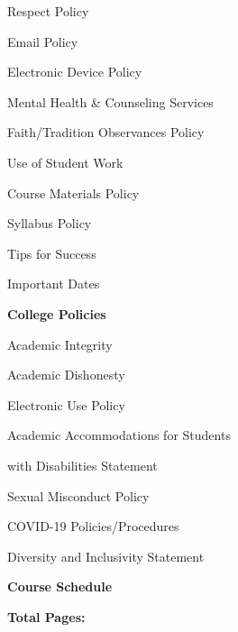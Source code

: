 \documentclass[11pt,letterpaper]{article}
\begin{document}
\begin{minipage}[t]{0.45\textwidth}
\hspace{0.3cm} Respect Policy \dotfill \pageref{respect}
%
\end{minipage}\hfill\begin{minipage}[t]{0.45\textwidth} \par
\hspace{0.3cm} Email Policy \dotfill \pageref{email_policy} \par
\hspace{0.3cm} Electronic Device Policy \dotfill \pageref{electronic} \par
\hspace{0.3cm} Mental Health \& Counseling Services \dotfill \pageref{mental_health} \par
\hspace{0.3cm} Faith/Tradition Observances Policy \dotfill \pageref{faith} \par
\hspace{0.3cm} Use of Student Work \dotfill \pageref{std_work} \par
\hspace{0.3cm} Course Materials Policy \dotfill \pageref{copyright} \par
\hspace{0.3cm} Syllabus Policy \dotfill \pageref{syllabus} \par
\hspace{0.3cm} Tips for Success \dotfill \pageref{tips} \par
\hspace{0.3cm} Important Dates \dotfill \pageref{imp_dates} \par
{\bfseries\color{stacred} College Policies} \dotfill \pageref{college_polc} \par
\hspace{0.3cm} Academic Integrity \dotfill \pageref{college_acadint} \par
\hspace{0.3cm} Academic Dishonesty \dotfill \pageref{college_acaddis} \par
\hspace{0.3cm} Electronic Use Policy \dotfill \pageref{college_elecuse} \par
\hspace{0.3cm} Academic Accommodations for Students \par
\hspace{0.6cm} with Disabilities Statement \dotfill \pageref{college_acadacc} \par
\hspace{0.3cm} Sexual Misconduct Policy \dotfill \pageref{college_sexmisconduct} \par
\hspace{0.3cm} COVID-19 Policies/Procedures \dotfill \pageref{college_healthsafety} \par
\hspace{0.3cm} Diversity and Inclusivity Statement \dotfill \pageref{college_inclusive} \par
{\bfseries\color{stacred} Course Schedule} \dotfill \pageref{schd} \par
\hfill {\bfseries\color{stacred} Total Pages:} \pageref*{LastPage}
\end{minipage}
\end{document}
